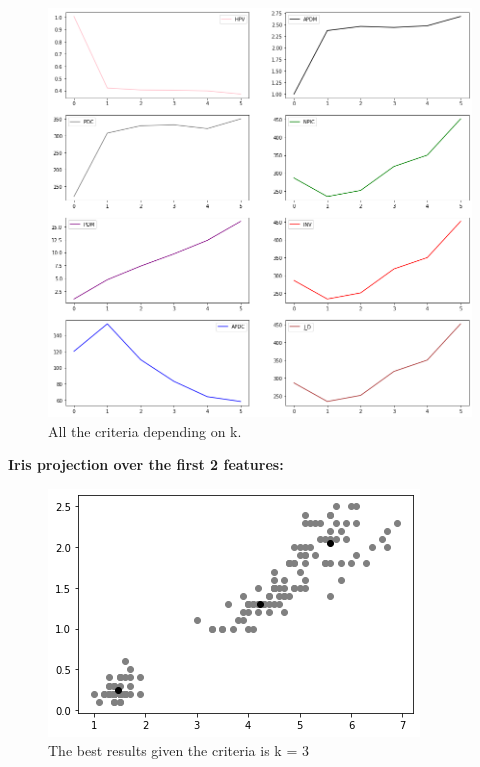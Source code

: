 \documentclass[12pt, a4paper]{paper}
\begin{document}
\begin{figure}[h!]
\centering
\includegraphics[scale=0.4]{iris_pca_plot_uofc.png}
\caption{All the criteria depending on k.}
\label{fig:Circular_3}
\end{figure}

\newpage

\textbf{Iris projection over the first 2 features:}

\begin{figure}[h!]
\centering
\includegraphics[scale=0.5]{best_iris_2D_uofc.png}
\caption{The best results given the criteria is k = 3}
\label{fig:Circular_3}
\end{figure}
\end{document}
